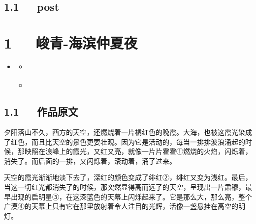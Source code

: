 \documentclass[letterpaper,12pt,english]{sphinxmanual}
\begin{document}
\section{1.1   post}
\label{\detokenize{p01_u6563_u6587/Hello_uff0cp01_u6563_u6587:post}}

\chapter{1   峻青-海滨仲夏夜}
\label{\detokenize{p01_u6563_u6587/_u5cfb_u9752-_u6d77_u6ee8_u4ef2_u590f_u591c:id1}}\label{\detokenize{p01_u6563_u6587/_u5cfb_u9752-_u6d77_u6ee8_u4ef2_u590f_u591c::doc}}
\begin{sphinxShadowBox}
\begin{itemize}
\item {} 
\label{\detokenize{p01_u6563_u6587/_u5cfb_u9752-_u6d77_u6ee8_u4ef2_u590f_u591c:id5}}{\hyperref[\detokenize{p01_u6563_u6587/_u5cfb_u9752-_u6d77_u6ee8_u4ef2_u590f_u591c:id1}]{}}
\begin{itemize}
\item {} 
\label{\detokenize{p01_u6563_u6587/_u5cfb_u9752-_u6d77_u6ee8_u4ef2_u590f_u591c:id6}}{\hyperref[\detokenize{p01_u6563_u6587/_u5cfb_u9752-_u6d77_u6ee8_u4ef2_u590f_u591c:id3}]{}}

\item {} 
\label{\detokenize{p01_u6563_u6587/_u5cfb_u9752-_u6d77_u6ee8_u4ef2_u590f_u591c:id7}}{\hyperref[\detokenize{p01_u6563_u6587/_u5cfb_u9752-_u6d77_u6ee8_u4ef2_u590f_u591c:id4}]{}}

\end{itemize}

\end{itemize}
\end{sphinxShadowBox}


\section{1.1   作品原文}
\label{\detokenize{p01_u6563_u6587/_u5cfb_u9752-_u6d77_u6ee8_u4ef2_u590f_u591c:id3}}
夕阳落山不久，西方的天空，还燃烧着一片橘红色的晚霞。大海，也被这霞光染成了红色，而且比天空的景色更要壮观。因为它是活动的，每当一排排波浪涌起的时候，那映照在浪峰上的霞光，又红又亮，就像一片片霍霍①燃烧的火焰，闪烁着，消失了。而后面的一排，又闪烁着，滚动着，涌了过来。

天空的霞光渐渐地淡下去了，深红的颜色变成了绯红②，绯红又变为浅红。最后，当这一切红光都消失了的时候，那突然显得高而远了的天空，呈现出一片肃穆，最早出现的启明星③，在这深蓝色的天幕上闪烁起来了。它是那么大，那么亮，整个广漠④的天幕上只有它在那里放射着令人注目的光辉，活像一盏悬挂在高空的明灯。
\end{document}

